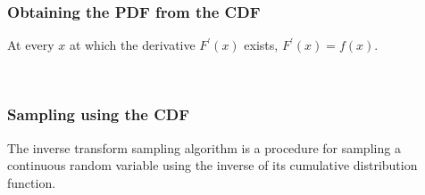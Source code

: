 \documentclass[10pt]{beamer}
\begin{document}
\begin{frame}
\frametitle{Obtaining the PDF from the CDF}

At every $x$ at which the derivative $F^\prime(x)$ exists, $F^\prime(x) = f(x)$.

\

\end{frame}

\begin{frame}
\frametitle{Sampling using the CDF}

The inverse transform sampling algorithm is a procedure for sampling a continuous random variable
using the inverse of its cumulative distribution function.

\


\ 


\end{frame}
\end{document}
